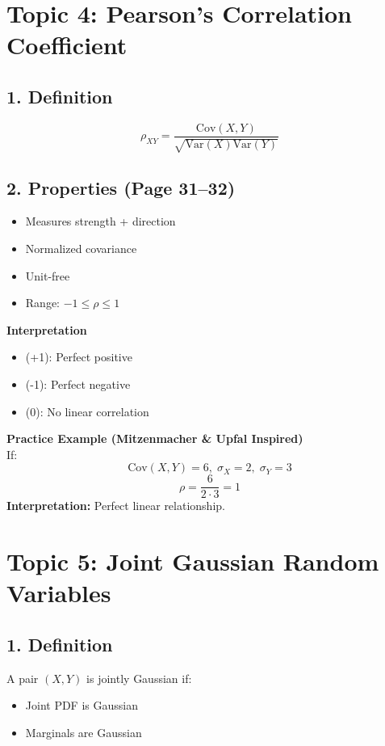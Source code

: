 \documentclass[11pt]{article}
\begin{document}
\section*{Topic 4: Pearson’s Correlation Coefficient}

\subsection*{1. Definition}
\[
\rho_{XY} = \frac{\text{Cov}(X,Y)}{\sqrt{\text{Var}(X)\text{Var}(Y)}}
\]

\subsection*{2. Properties (Page 31–32)}
\begin{itemize}
    \item Measures strength + direction
    \item Normalized covariance
    \item Unit-free
    \item Range: $-1 \le \rho \le 1$
\end{itemize}

\noindent\textbf{Interpretation}
\begin{itemize}
    \item (+1): Perfect positive
    \item (-1): Perfect negative
    \item (0): No linear correlation
\end{itemize}

\noindent\textbf{Practice Example (Mitzenmacher \& Upfal Inspired)}\\
If:
\[
\text{Cov}(X,Y)=6,\; \sigma_X=2,\; \sigma_Y=3
\]
\[
\rho=\frac{6}{2\cdot 3}=1
\]
\textbf{Interpretation:} Perfect linear relationship.

\newpage

\section*{Topic 5: Joint Gaussian Random Variables}

\subsection*{1. Definition}
A pair $(X,Y)$ is jointly Gaussian if:
\begin{itemize}
    \item Joint PDF is Gaussian
    \item Marginals are Gaussian
\end{itemize}
\end{document}

